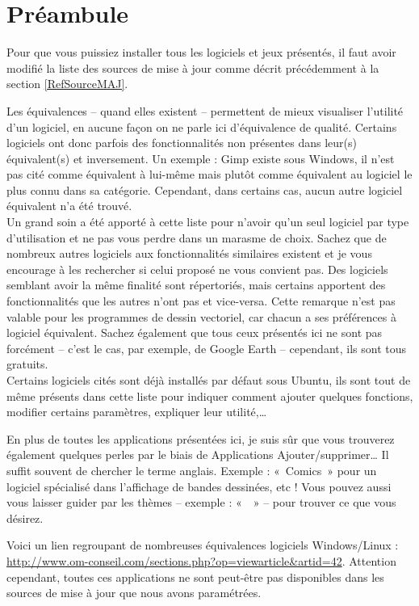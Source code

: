 \section{Préambule}
Pour que vous puissiez installer tous les logiciels et jeux présentés,  il faut avoir modifié la liste des sources de mise à jour comme décrit précédemment à la section \ref{RefSourceMAJ}.\par
Les équivalences -- quand elles existent -- permettent de mieux visualiser l'utilité d'un logiciel, en aucune façon on ne parle ici d'équivalence de qualité. Certains logiciels ont donc parfois des fonctionnalités non présentes dans leur(s) équivalent(s) et inversement. Un exemple : Gimp existe sous Windows, il n'est pas cité comme équivalent à lui-même mais plutôt comme équivalent au logiciel le plus connu dans sa catégorie. Cependant, dans certains cas, aucun autre logiciel équivalent n'a été trouvé.\\
Un grand soin a été apporté à cette liste pour n'avoir qu'un seul logiciel par type d'utilisation et ne pas vous perdre dans un marasme de choix. Sachez que de nombreux autres logiciels aux fonctionnalités similaires existent et je vous encourage à les rechercher si celui proposé ne vous convient pas. Des logiciels semblant avoir la même finalité sont répertoriés, mais certains apportent des fonctionnalités que les autres n'ont pas et vice-versa. Cette remarque n'est pas valable pour les programmes de dessin vectoriel, car chacun a ses préférences à logiciel équivalent. Sachez également que tous ceux présentés ici ne sont pas forcément  -- c'est le cas, par exemple, de Google Earth -- cependant, ils sont tous gratuits.\\
Certains logiciels cités sont déjà installés par défaut sous Ubuntu, ils sont tout de même présents dans cette liste pour indiquer comment ajouter quelques fonctions, modifier certains paramètres, expliquer leur utilité,\ldots{}\par
En plus de toutes les applications présentées ici, je suis sûr que vous trouverez également quelques perles par le biais de Applications \FlecheDroite Ajouter/supprimer\dots{} Il suffit souvent de chercher le terme anglais. Exemple : «~Comics~» pour un logiciel spécialisé dans l'affichage de bandes dessinées, etc ! Vous pouvez aussi vous laisser guider par les thèmes -- exemple : «~~» -- pour trouver ce que vous désirez.\par
\begin{nota}
Voici un lien regroupant de nombreuses équivalences logiciels Windows/Linux : \\\url{http://www.om-conseil.com/sections.php?op=viewarticle&artid=42}. Attention cependant, toutes ces applications ne sont peut-être pas disponibles dans les sources de mise à jour que nous avons paramétrées.
\end{nota}
